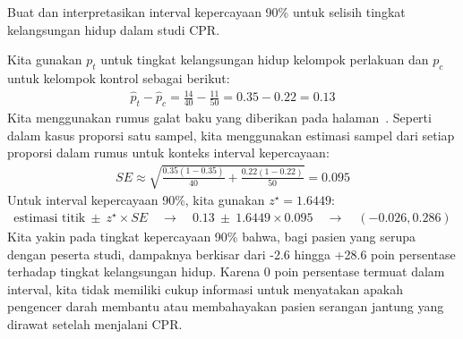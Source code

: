 \begin{examplewrap}
\begin{nexample}{
    Buat dan interpretasikan interval kepercayaan 90\% untuk
    selisih tingkat kelangsungan hidup dalam studi CPR.}

  Kita gunakan $p_t$ untuk tingkat kelangsungan
  hidup kelompok perlakuan dan $p_c$ untuk kelompok kontrol
  sebagai berikut:
  \begin{align*}
  \hat{p}_{t} - \hat{p}_{c}
    = \frac{14}{40} - \frac{11}{50}
    = 0.35 - 0.22
    = 0.13
  \end{align*}
  Kita menggunakan rumus galat baku yang diberikan pada
  halaman~\pageref{seForDiffOfProp}.
  Seperti dalam kasus proporsi satu sampel,
  kita menggunakan estimasi sampel dari setiap proporsi
  dalam rumus untuk konteks interval kepercayaan:
  \begin{align*}
  SE \approx \sqrt{\frac{0.35 (1 - 0.35)}{40} +
      \frac{0.22 (1 - 0.22)}{50}}
    = 0.095
  \end{align*}
  Untuk interval kepercayaan 90\%, kita gunakan $z^{\star} = 1.6449$:
  \begin{align*}
  \text{estimasi titik} \ \pm\ z^{\star} \times SE
    \quad \to \quad 0.13 \ \pm\ 1.6449 \times  0.095
    \quad \to \quad (-0.026, 0.286)
  \end{align*}
  Kita yakin pada tingkat kepercayaan 90\% bahwa,
  bagi pasien yang serupa dengan peserta studi,
  dampaknya berkisar dari -2.6 hingga +28.6
  poin persentase terhadap tingkat kelangsungan hidup.
  Karena 0 poin persentase termuat dalam interval,
  kita tidak memiliki cukup informasi untuk menyatakan
  apakah pengencer darah membantu atau membahayakan
  pasien serangan jantung yang dirawat setelah
  menjalani CPR.
\end{nexample}
\end{examplewrap}



